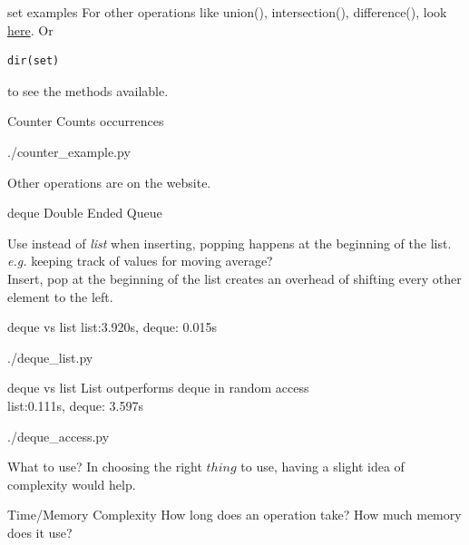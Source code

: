 \documentclass{beamer}
\begin{document}
\begin{frame}[fragile]{set examples}
  For other operations like union(), intersection(), difference(), look
  \href{https://docs.python.org/3.7/library/stdtypes.html\#set}{here}.
  Or
  \begin{lstlisting}
dir(set)
  \end{lstlisting}
  to see the methods available.
\end{frame}

\begin{frame}{Counter}
  Counts occurrences
  \begin{lstinputlisting}
    {./counter_example.py}
  \end{lstinputlisting}
  Other operations are on the website.
\end{frame}

\begin{frame}{deque}
  Double Ended Queue

  Use instead of \textit{list} when inserting, popping happens at the beginning
  of the list. \textit{e.g.} keeping track of values for moving average?\\
  Insert, pop at the beginning of the list creates an overhead of
  shifting every other element to the left.\\
\end{frame}

\begin{frame}{deque vs list}
  list:3.920s, deque: 0.015s
  \begin{lstinputlisting}
    {./deque_list.py}
  \end{lstinputlisting}
\end{frame}

\begin{frame}{deque vs list}
  List outperforms deque in random access\\
  list:0.111s, deque: 3.597s
  \begin{lstinputlisting}
    {./deque_access.py}
  \end{lstinputlisting}
\end{frame}

\begin{frame}{What to use?}
  In choosing the right $thing$ to use, having a slight idea of complexity
  would help.
\end{frame}

\begin{frame}{Time/Memory Complexity}
  How long does an operation take? How much memory does it use?\\
\end{frame}
\end{document}

